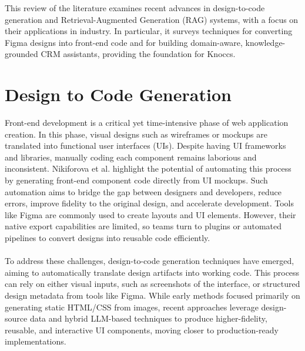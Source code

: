 This review of the literature examines recent advances in design-to-code generation and Retrieval-Augmented Generation (RAG) systems, with a focus on their applications in industry. In particular, it surveys techniques for converting Figma designs into front-end code and for building domain-aware, knowledge-grounded CRM assistants, providing the foundation for Knoccs.

\section{Design to Code Generation}
Front-end development is a critical yet time-intensive phase of web application creation. In this phase, visual designs such as wireframes or mockups are translated into functional user interfaces (UIs). Despite having UI frameworks and libraries, manually coding each component remains laborious and inconsistent. Nikiforova et al. \cite{Nikiforova} highlight the potential of automating this process by generating front-end component code directly from UI mockups. Such automation aims to bridge the gap between designers and developers, reduce errors, improve fidelity to the original design, and accelerate development. Tools like Figma are commonly used to create layouts and UI elements. However, their native export capabilities are limited, so teams turn to plugins or automated pipelines to convert designs into reusable code efficiently.
\\\\
To address these challenges, design-to-code generation techniques have emerged, aiming to automatically translate design artifacts into working code. This process can rely on either visual inputs, such as screenshots of the interface, or structured design metadata from tools like Figma. While early methods focused primarily on generating static HTML/CSS from images, recent approaches leverage design-source data and hybrid LLM-based techniques to produce higher-fidelity, reusable, and interactive UI components, moving closer to production-ready implementations.

